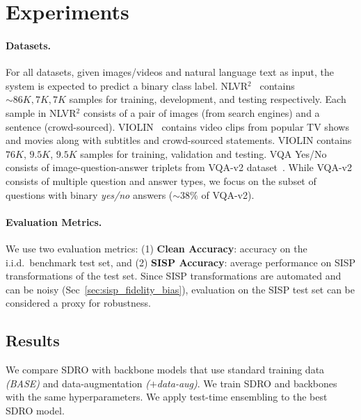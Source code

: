 \section{Experiments}
\paragraph{Datasets.}
For all datasets, given images/videos and natural language text as input, the system is expected to predict a binary class label.
NLVR$^2$~\citep{suhr2019corpus} contains ${\sim}86K, 7K, 7K$ samples for training, development, and testing respectively.
Each sample in NLVR$^2$ consists of a pair of images (from search engines) and a sentence (crowd-sourced).
VIOLIN~\citep{liu2020violin} contains video clips from popular TV shows and movies along with subtitles and crowd-sourced statements.
VIOLIN contains $76K$, $9.5K$, $9.5K$ samples for training, validation and testing.
VQA Yes/No consists of image-question-answer triplets from VQA-v2 dataset~\citep{goyal2017making}.
While VQA-v2 consists of multiple question and answer types, we focus on the subset of questions with binary \textit{yes/no} answers (${\sim}38\%$ of VQA-v2).
    
\paragraph{Evaluation Metrics.}
We use two evaluation metrics:
(1) \textbf{Clean Accuracy}: accuracy on the i.i.d.\ benchmark test set, and
(2) \textbf{SISP Accuracy}: average performance on SISP transformations of the test set.
Since SISP transformations are automated and can be noisy (Sec~\ref{sec:sisp_fidelity_bias}), evaluation on the SISP test set can be considered a proxy for robustness.


\subsection{Results}
We compare SDRO with backbone models that use standard training data \textit{(BASE)} and data-augmentation \textit{($+$data-aug)}.
We train SDRO and backbones with the same hyperparameters.
We apply test-time ensembling to the best SDRO model.
